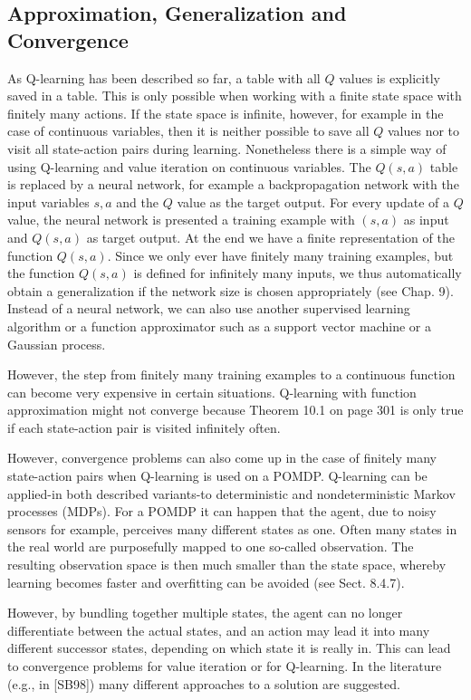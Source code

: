 \documentclass[10pt]{book}
\begin{document}
\subsection{Approximation, Generalization and Convergence}
As Q-learning has been described so far, a table with all $Q$ values is explicitly saved in a table. This is only possible when working with a finite state space with finitely many actions. If the state space is infinite, however, for example in the case of continuous variables, then it is neither possible to save all $Q$ values nor to visit all state-action pairs during learning.
Nonetheless there is a simple way of using Q-learning and value iteration on continuous variables. The $Q(s, a)$ table is replaced by a neural network, for example a backpropagation network with the input variables $s, a$ and the $Q$ value as the target output. For every update of a $Q$ value, the neural network is presented a training example with $(s, a)$ as input and $Q(s, a)$ as target output. At the end we have a finite representation of the function $Q(s, a)$. Since we only ever have finitely many training examples, but the function $Q(s, a)$ is defined for infinitely many inputs, we thus automatically obtain a generalization if the network size is chosen appropriately (see Chap. 9). Instead of a neural network, we can also use another supervised learning algorithm or a function approximator such as a support vector machine or a Gaussian process.

However, the step from finitely many training examples to a continuous function can become very expensive in certain situations. Q-learning with function approximation might not converge because Theorem 10.1 on page 301 is only true if each state-action pair is visited infinitely often.

However, convergence problems can also come up in the case of finitely many state-action pairs when Q-learning is used on a POMDP. Q-learning can be applied-in both described variants-to deterministic and nondeterministic Markov processes (MDPs). For a POMDP it can happen that the agent, due to noisy sensors for example, perceives many different states as one. Often many states in the real world are purposefully mapped to one so-called observation. The resulting observation space is then much smaller than the state space, whereby learning becomes faster and overfitting can be avoided (see Sect. 8.4.7).

However, by bundling together multiple states, the agent can no longer differentiate between the actual states, and an action may lead it into many different successor states, depending on which state it is really in. This can lead to convergence problems for value iteration or for Q-learning. In the literature (e.g., in [SB98]) many different approaches to a solution are suggested.
\end{document}
